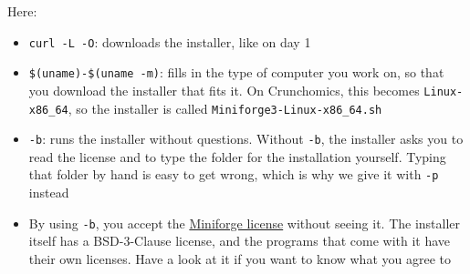 \documentclass[
  letterpaper,
  DIV=11,
  numbers=noendperiod]{scrreprt}
\providecommand{\tightlist}{%
  \setlength{\itemsep}{0pt}\setlength{\parskip}{0pt}}
\begin{document}
Here:

\begin{itemize}
\tightlist
\item
  \texttt{curl\ -L\ -O}: downloads the installer, like on day 1
\item
  \texttt{\$(uname)-\$(uname\ -m)}: fills in the type of computer you
  work on, so that you download the installer that fits it. On
  Crunchomics, this becomes \texttt{Linux-x86\_64}, so the installer is
  called \texttt{Miniforge3-Linux-x86\_64.sh}
\item
  \texttt{-b}: runs the installer without questions. Without
  \texttt{-b}, the installer asks you to read the license and to type
  the folder for the installation yourself. Typing that folder by hand
  is easy to get wrong, which is why we give it with \texttt{-p} instead
\item
  By using \texttt{-b}, you accept the
  \href{https://github.com/conda-forge/miniforge/blob/main/LICENSE}{Miniforge
  license} without seeing it. The installer itself has a BSD-3-Clause
  license, and the programs that come with it have their own licenses.
  Have a look at it if you want to know what you agree to
\end{itemize}
\end{document}
